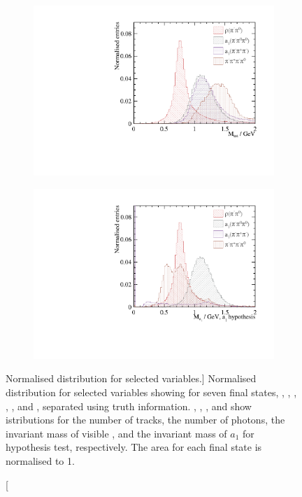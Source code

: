 \begin{figure}[htbp]
\begin{subfigure}[b]{0.45\textwidth}
 \includegraphics[width=\textwidth]{tau/var2/mVis_100GeV_improved_zoom.pdf}
  \caption{}
  \label{fig:tauVarMVis}
\end{subfigure}
\begin{subfigure}[b]{0.45\textwidth}
 \includegraphics[width=\textwidth]{tau/var2/mA1A1Fit_100GeV_improved_zoom.pdf}
  \caption{}
  \label{fig:tauVarMA1}
\end{subfigure}

\caption
[Normalised distribution for selected variables.]
{
Normalised distribution for selected variables showing for seven final states, \decayElectronShort, \decayMuonShort, \decayPionShort, \decayRhoShort, \decayAiPhotonShort, \decayAiPionShort and \decayThreePionPhotonShort, separated using truth information. , , , and  show istributions for the number of tracks, the number of photons, the invariant mass of visible \PFOs, and the invariant mass of $a_1$ for \decayAiPhotonShort hypothesis test, respectively. The area for each final state is normalised to 1.
}
\label{fig:tauVar}
\end{figure}

